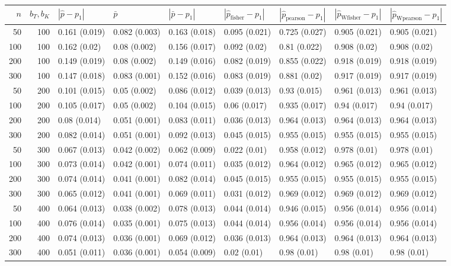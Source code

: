 \documentclass[10pt, a4paper]{article}
\begin{document}
\begin{landscape}
\begin{table}[ht]
\centering
\begin{tabular}{rrlllllll}
  \hline
$n$ & $b_T,b_K$ & $|\hat p -p_1|$ & $\bar p$ & $|\bar p - p_1|$ & $|\hat p_{\text{fisher}} - p_1|$ & $|\hat p_{\text{pearson}} - p_1|$ & $|\hat p_{\text{Wfisher}} - p_1|$ & $|\hat p_{\text{Wpearson}} - p_1|$ \\ 
  \hline
50 & 100 & 0.161 (0.019) & 0.082 (0.003) & 0.163 (0.018) & 0.095 (0.021) & 0.725 (0.027) & 0.905 (0.021) & 0.905 (0.021) \\ 
100 & 100 & 0.162 (0.02) & 0.08 (0.002) & 0.156 (0.017) & 0.092 (0.02) & 0.81 (0.022) & 0.908 (0.02) & 0.908 (0.02) \\ 
200 & 100 & 0.149 (0.019) & 0.08 (0.002) & 0.149 (0.016) & 0.082 (0.019) & 0.855 (0.022) & 0.918 (0.019) & 0.918 (0.019) \\ 
300 & 100 & 0.147 (0.018) & 0.083 (0.001) & 0.152 (0.016) & 0.083 (0.019) & 0.881 (0.02) & 0.917 (0.019) & 0.917 (0.019) \\ 
50 & 200 & 0.101 (0.015) & 0.05 (0.002) & 0.086 (0.012) & 0.039 (0.013) & 0.93 (0.015) & 0.961 (0.013) & 0.961 (0.013) \\ 
100 & 200 & 0.105 (0.017) & 0.05 (0.002) & 0.104 (0.015) & 0.06 (0.017) & 0.935 (0.017) & 0.94 (0.017) & 0.94 (0.017) \\ 
200 & 200 & 0.08 (0.014) & 0.051 (0.001) & 0.083 (0.011) & 0.036 (0.013) & 0.964 (0.013) & 0.964 (0.013) & 0.964 (0.013) \\ 
300 & 200 & 0.082 (0.014) & 0.051 (0.001) & 0.092 (0.013) & 0.045 (0.015) & 0.955 (0.015) & 0.955 (0.015) & 0.955 (0.015) \\ 
50 & 300 & 0.067 (0.013) & 0.042 (0.002) & 0.062 (0.009) & 0.022 (0.01) & 0.958 (0.012) & 0.978 (0.01) & 0.978 (0.01) \\ 
100 & 300 & 0.073 (0.014) & 0.042 (0.001) & 0.074 (0.011) & 0.035 (0.012) & 0.964 (0.012) & 0.965 (0.012) & 0.965 (0.012) \\ 
200 & 300 & 0.074 (0.014) & 0.041 (0.001) & 0.082 (0.014) & 0.045 (0.015) & 0.955 (0.015) & 0.955 (0.015) & 0.955 (0.015) \\ 
300 & 300 & 0.065 (0.012) & 0.041 (0.001) & 0.069 (0.011) & 0.031 (0.012) & 0.969 (0.012) & 0.969 (0.012) & 0.969 (0.012) \\ 
50 & 400 & 0.064 (0.013) & 0.038 (0.002) & 0.078 (0.013) & 0.044 (0.014) & 0.946 (0.015) & 0.956 (0.014) & 0.956 (0.014) \\ 
100 & 400 & 0.076 (0.014) & 0.035 (0.001) & 0.075 (0.013) & 0.044 (0.014) & 0.956 (0.014) & 0.956 (0.014) & 0.956 (0.014) \\ 
200 & 400 & 0.074 (0.013) & 0.036 (0.001) & 0.069 (0.012) & 0.036 (0.013) & 0.964 (0.013) & 0.964 (0.013) & 0.964 (0.013) \\ 
300 & 400 & 0.051 (0.011) & 0.036 (0.001) & 0.054 (0.009) & 0.02 (0.01) & 0.98 (0.01) & 0.98 (0.01) & 0.98 (0.01) \\ 
   \hline\end{tabular}
\end{table}
\end{landscape}
\end{document}
